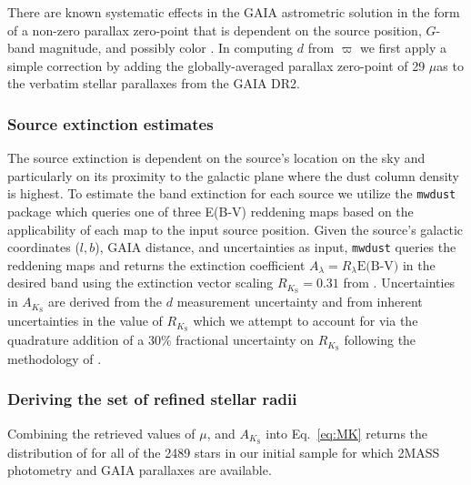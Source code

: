 There are known systematic effects in the GAIA astrometric solution in the form of a non-zero parallax zero-point
that is dependent on the source position, $G$-band magnitude, and possibly color \citep{lindegren18}.
In computing $d$ from $\varpi$ we first apply a simple correction by adding the globally-averaged parallax
zero-point of 29 $\mu$as \citep{lindegren18} to the verbatim stellar parallaxes from the GAIA DR2.

\subsubsection{Source extinction estimates} \label{sect:AK}
The source extinction is dependent on the source's location on the sky and particularly on
its proximity to the galactic plane where the dust column density is highest. To estimate the \Ks{-}band extinction
for each source we utilize the \texttt{mwdust} package \citep{bovy16} which queries one of three E(B-V) reddening maps
\citep[i.e.][]{drimmel03,marshall06,green15} based on the applicability of each map to the input source position.
Given the source's galactic coordinates ($l,b$), GAIA distance, and uncertainties as input, \texttt{mwdust}
queries the reddening maps and returns the extinction coefficient $A_{\lambda}=R_{\lambda} \text{E(B-V)}$ in the desired
band using the extinction vector scaling $R_{K_{\text{S}}}=0.31$ from \cite{schlafly11}. Uncertainties in $A_{K_{\text{S}}}$ are
derived from the $d$ measurement uncertainty and from inherent uncertainties in the value of $R_{K_{\text{S}}}$
\citep[e.g.]{green18}
which we attempt to account for via the quadrature addition of a 30\% fractional uncertainty on $R_{K_{\text{S}}}$ following
the methodology of \citep{fulton18}.

\subsubsection{Deriving the set of refined stellar radii}
Combining the retrieved values of \Ks{,} $\mu$, and $A_{K_{\text{S}}}$ into Eq.~\ref{eq:MK} returns the
distribution of \MK{} for all of the 2489 stars in our initial sample for which 2MASS photometry and GAIA
parallaxes are available.

